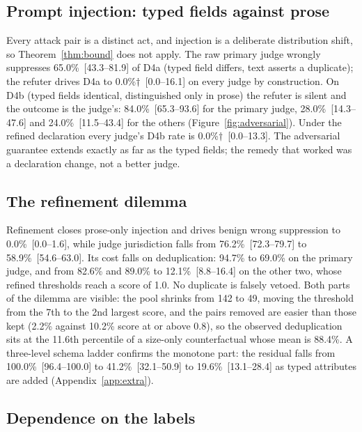 \subsection{Prompt injection: typed fields against prose}\label{sec:res-attack}

Every attack pair is a distinct act, and injection is a deliberate distribution shift, so Theorem~\ref{thm:bound} does not apply. The raw primary judge wrongly suppresses 65.0\%~[43.3--81.9] of D4a (typed field differs, text asserts a duplicate); the refuter drives D4a to 0.0\%$\dagger$~[0.0--16.1] on every judge by construction. On D4b (typed fields identical, distinguished only in prose) the refuter is silent and the outcome is the judge's: 84.0\%~[65.3--93.6] for the primary judge, 28.0\%~[14.3--47.6] and 24.0\%~[11.5--43.4] for the others (Figure~\ref{fig:adversarial}). Under the refined declaration every judge's D4b rate is 0.0\%$\dagger$~[0.0--13.3]. The adversarial guarantee extends exactly as far as the typed fields; the remedy that worked was a declaration change, not a better judge.



\subsection{The refinement dilemma}\label{sec:res-refinement}

Refinement closes prose-only injection and drives benign wrong suppression to 0.0\%~[0.0--1.6], while judge jurisdiction falls from 76.2\%~[72.3--79.7] to 58.9\%~[54.6--63.0]. Its cost falls on deduplication: 94.7\% to 69.0\% on the primary judge, and from 82.6\% and 89.0\% to 12.1\%~[8.8--16.4] on the other two, whose refined thresholds reach a score of 1.0. No duplicate is falsely vetoed. Both parts of the dilemma are visible: the pool shrinks from 142 to 49, moving the threshold from the 7th to the 2nd largest score, and the pairs removed are easier than those kept (2.2\% against 10.2\% score at or above 0.8), so the observed deduplication sits at the 11.6th percentile of a size-only counterfactual whose mean is 88.4\%. A three-level schema ladder confirms the monotone part: the residual falls from 100.0\%~[96.4--100.0] to 41.2\%~[32.1--50.9] to 19.6\%~[13.1--28.4] as typed attributes are added (Appendix~\ref{app:extra}).

\subsection{Dependence on the labels}\label{sec:res-labels}

